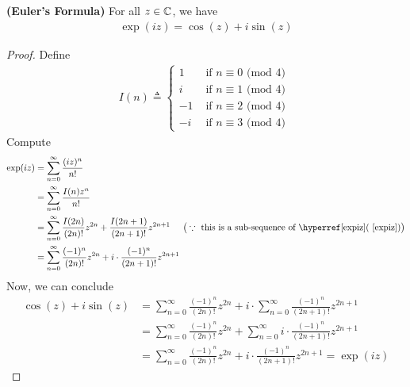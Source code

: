 \documentclass{report}
\begin{document}
\begin{theorem}
\label{Euler's Formula}
\textbf{(Euler's Formula)} For all $z\in\mathbb{C}$, we have
\begin{align*}
\exp(iz)=\cos (z) + i \sin (z)
\end{align*}
\end{theorem}
\begin{proof}
Define 
\begin{align*}
I(n)\triangleq \begin{cases}
  1& \text{ if $n \equiv 0$ (mod $4$) }\\
  i& \text{ if $n \equiv 1$ (mod $4$) }\\
  -1& \text{ if $n \equiv 2$ (mod $4$) }\\
  -i& \text{ if $n \equiv 3$ (mod $4$) }
\end{cases}
\end{align*}
Compute 
\begin{align}
\label{expiz}
\exp(iz)&=\sum_{n=0}^\infty \frac{(iz)^n}{n!}\notag\\ 
&=\sum_{n=0}^{\infty} \frac{I(n)z^n}{n!}\\
&=\sum_{n=0}^{\infty} \frac{I(2n)}{(2n)!}z^{2n}+\frac{I(2n+1)}{(2n+1)!}z^{2n+1}\hspace{0.5cm}\big(\because \text{ this is a sub-sequence of \myref{(}{expiz})}\big)\notag\\
&= \sum_{n=0}^{\infty} \frac{(-1)^{n}}{(2n)!}z^{2n}+ i\cdot \frac{(-1)^n}{(2n+1)!}z^{2n+1} \notag
\end{align}
Now, we can conclude 
\begin{align*}
\cos (z)+i \sin (z)&= \sum_{n=0}^{\infty}\frac{(-1)^{n}}{(2n)!}z^{2n} + i \cdot \sum_{n=0}^{\infty} \frac{(-1)^{n}}{(2n+1)!}z^{2n+1}\\
&=\sum_{n=0}^{\infty}\frac{(-1)^{n}}{(2n)!}z^{2n} +  \sum_{n=0}^{\infty} i\cdot  \frac{(-1)^{n}}{(2n+1)!}z^{2n+1} \\
&=\sum_{n=0}^{\infty}\frac{(-1)^{n}}{(2n)!}z^{2n} +  i\cdot  \frac{(-1)^{n}}{(2n+1)!}z^{2n+1} =\exp (iz)
\end{align*}
\end{proof}
\end{document}
